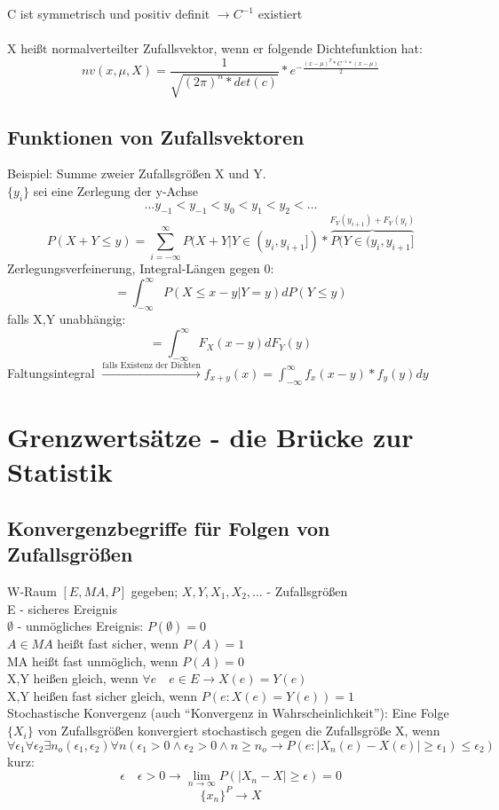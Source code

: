 \documentclass[a4paper,12pt]{scrartcl}
\begin{document}
 C ist symmetrisch und positiv definit $\rightarrow C^{-1}$ existiert\\
 \\
 X heißt normalverteilter Zufallsvektor, wenn er folgende Dichtefunktion hat:
 $$nv(x,\mu,X) = \frac{1}{\sqrt{(2\pi)^n * det(c)}}*e^{-\frac{(x-\mu)^T*C^{-1}*(x-\mu)}{2}}$$
 
 \subsection{Funktionen von Zufallsvektoren}
 Beispiel: Summe zweier Zufallsgrößen X und Y.\\
 $\{y_i\}$ sei eine Zerlegung der y-Achse
 $$\dots y_{-1}<y_{-1}<y_0<y_1<y_2<\dots$$
 $$P(X+Y\leq y) = \sum_{i=-\infty}^\infty P(X+Y|Y\in(y_i,y_{i+1}])*\overbrace{P(Y\in(y_i,y_{i+1}]}^{F_Y(y_{i+1})+F_Y(y_i)} $$
 Zerlegungsverfeinerung, Integral-Längen gegen 0:
 $$= \int^\infty_{-\infty} P(X\leq x-y | Y=y) dP(Y\leq y) $$
 falls X,Y unabhängig:
 $$= \int^\infty_{-\infty} F_X(x-y) dF_Y(y) $$
 Faltungsintegral $\overset{\text{falls Existenz der Dichten}}{\rightarrow} f_{x+y}(x) = \int^\infty_{-\infty} f_x(x-y)*f_y(y)dy$
 
 \section{Grenzwertsätze - die Brücke zur Statistik}
 
 \subsection{Konvergenzbegriffe für Folgen von Zufallsgrößen}
 
 W-Raum $[E,MA,P]$ gegeben; $X,Y,X_1,X_2,\dots$  - Zufallsgrößen\\
 E - sicheres Ereignis\\
 $\emptyset$ - unmögliches Ereignis: $P(\emptyset) = 0$\\
 $A\in MA$ heißt fast sicher, wenn $P(A) = 1$\\
 MA heißt fast unmöglich, wenn $P(A) = 0$\\
 X,Y heißen gleich, wenn $\forall e\quad e\in E\rightarrow X(e) = Y(e)$\\
 X,Y heißen fast sicher gleich, wenn $P(e:X(e) = Y(e))=1$\\
 Stochastische Konvergenz (auch "`Konvergenz in Wahrscheinlichkeit"'): Eine Folge $\{X_i\}$ von Zufallsgrößen konvergiert stochastisch gegen die Zufallsgröße X, wenn 
 $$\forall \epsilon_1 \forall \epsilon_2 \exists n_o(\epsilon_1,\epsilon_2) \forall n(\epsilon_1>0\wedge\epsilon_2>0\wedge n \geq n_o \rightarrow P(e: |X_n(e)-X(e)|\geq \epsilon_1)\leq \epsilon_2)$$
 kurz: $$\epsilon\quad\epsilon>0\rightarrow\lim_{n\rightarrow\infty}P(|X_n-X|\geq\epsilon)=0$$
 $$\{x_n\}^P\rightarrow X $$
 
\end{document}
